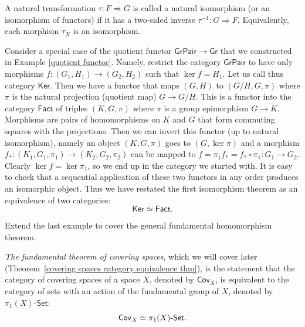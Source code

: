 %
\begin{defn}
    A natural transformation $\tau:F\Longrightarrow G$ is called a natural isomorphism (or an isomorphism of functors) if it has a two-sided inverse $\tau^{-1}:G\Longrightarrow F$. Equivalently, each morphism $\tau_X$ is an isomorphism.
\end{defn}
%
\begin{example}
Consider a special case of the quotient functor $\mathsf{GrPair}\to\mathsf{Gr}$
that we constructed in Example \ref{quotient functor}. Namely, restrict
the category $\mathsf{GrPair}$ to have only morphisms $f:\left(G_{1},H_{1}\right)\to\left(G_{2},H_{2}\right)$
such that $\ker f=H_{1}$. Let us call thus category $\mathsf{Ker}$.
Then we have a functor that maps $\left(G,H\right)$ to $\left(G/H,G,\pi\right)$
where $\pi$ is the natural projection (quotient map) $G\to G/H$.
This is a functor into the category $\mathsf{Fact}$ of triples $\left(K,G,\pi\right)$
where $\pi$ is a group epimorphism $G\to K$. Morphisms are pairs
of homomorphisms on $K$ and $G$ that form commuting squares with
the projections. Then we can invert this functor (up to natural isomorphism),
namely an object $\left(K,G,\pi\right)$ goes to $\left(G,\ker\pi\right)$
and a morphism $f_{\ast}:\left(K_{1},G_{1},\pi_{1}\right)\to\left(K_{2},G_{2},\pi_{2}\right)$
can be mapped to $f=\pi_{1}f_{\ast}=f_{\ast}\circ\pi_{1}:G_{1}\to G_{2}$.
Clearly $\ker f=\ker\pi_{1}$, so we end up in the category we started
with. It is easy to check that a sequential application of these two
functors in any order produces an isomorphic object. Thus we have
restated the first isomorphism theorem as an equivalence of two categories:
\[
\mathsf{Ker}\simeq\mathsf{Fact}.
\]
\end{example}
\begin{xca}
Extend the last example to cover the general fundamental homomorphism
theorem.
\end{xca}
\begin{example}\label{covering category thm}
\emph{The fundamental theorem of covering spaces},
which we will cover later (Theorem~\ref{covering spaces category equivalence thm}), is the statement that the category of covering
spaces of a space $X$, denoted by $\mathsf{Cov}_{X}$, is equivalent
to the category of sets with an action of the fundamental group of
$X$, denoted by $\pi_{1}\left(X\right)\text{-}\mathsf{Set}$:
\[
\mathsf{Cov}_{X}\simeq \pi_{1}(X){\text -}\mathsf{Set}.
\]
\end{example}
%
